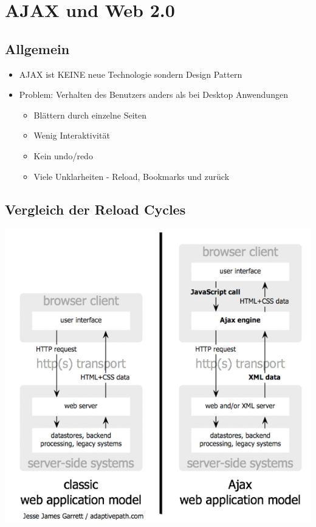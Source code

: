 \documentclass{article} %
\begin{document}
		
		
	\section{AJAX und Web 2.0}
	\subsection{Allgemein}
	\begin{itemize}
		\item AJAX ist KEINE neue Technologie sondern Design Pattern
		\item Problem: Verhalten des Benutzers anders als bei Desktop Anwendungen
		\begin{itemize}
			\item Blättern durch einzelne Seiten
			\item Wenig Interaktivität 
			\item Kein undo/redo
			\item Viele Unklarheiten - Reload, Bookmarks und zurück
		\end{itemize}
	\end{itemize}
	\subsection{Vergleich der Reload Cycles}
	\begin{center}
		\includegraphics[scale=0.5]{img/HTTP_Ajax.png}
	\end{center}
\end{document}
